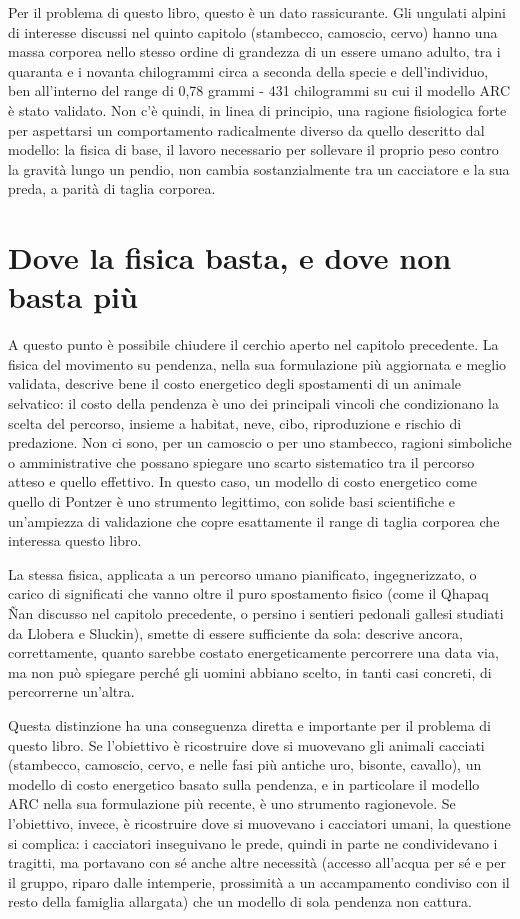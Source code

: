 Per il problema di questo libro, questo è un dato rassicurante. Gli ungulati alpini di interesse discussi nel quinto capitolo (stambecco, camoscio, cervo) hanno una massa corporea nello stesso ordine di grandezza di un essere umano adulto, tra i quaranta e i novanta chilogrammi circa a seconda della specie e dell'individuo, ben all'interno del range di 0,78 grammi - 431 chilogrammi su cui il modello ARC è stato validato. Non c'è quindi, in linea di principio, una ragione fisiologica forte per aspettarsi un comportamento radicalmente diverso da quello descritto dal modello: la fisica di base, il lavoro necessario per sollevare il proprio peso contro la gravità lungo un pendio, non cambia sostanzialmente tra un cacciatore e la sua preda, a parità di taglia corporea.

\section{Dove la fisica basta, e dove non basta più}

A questo punto è possibile chiudere il cerchio aperto nel capitolo precedente. La fisica del movimento su pendenza, nella sua formulazione più aggiornata e meglio validata, descrive bene il costo energetico degli spostamenti di un animale selvatico: il costo della pendenza è uno dei principali vincoli che condizionano la scelta del percorso, insieme a habitat, neve, cibo, riproduzione e rischio di predazione. Non ci sono, per un camoscio o per uno stambecco, ragioni simboliche o amministrative che possano spiegare uno scarto sistematico tra il percorso atteso e quello effettivo. In questo caso, un modello di costo energetico come quello di Pontzer è uno strumento legittimo, con solide basi scientifiche e un'ampiezza di validazione che copre esattamente il range di taglia corporea che interessa questo libro.

La stessa fisica, applicata a un percorso umano pianificato, ingegnerizzato, o carico di significati che vanno oltre il puro spostamento fisico (come il Qhapaq Ñan discusso nel capitolo precedente, o persino i sentieri pedonali gallesi studiati da Llobera e Sluckin), smette di essere sufficiente da sola: descrive ancora, correttamente, quanto sarebbe costato energeticamente percorrere una data via, ma non può spiegare perché gli uomini abbiano scelto, in tanti casi concreti, di percorrerne un'altra.

Questa distinzione ha una conseguenza diretta e importante per il problema di questo libro. Se l'obiettivo è ricostruire dove si muovevano gli animali cacciati (stambecco, camoscio, cervo, e nelle fasi più antiche uro, bisonte, cavallo), un modello di costo energetico basato sulla pendenza, e in particolare il modello ARC nella sua formulazione più recente, è uno strumento ragionevole. Se l'obiettivo, invece, è ricostruire dove si muovevano i cacciatori umani, la questione si complica: i cacciatori inseguivano le prede, quindi in parte ne condividevano i tragitti, ma portavano con sé anche altre necessità (accesso all'acqua per sé e per il gruppo, riparo dalle intemperie, prossimità a un accampamento condiviso con il resto della famiglia allargata) che un modello di sola pendenza non cattura.

